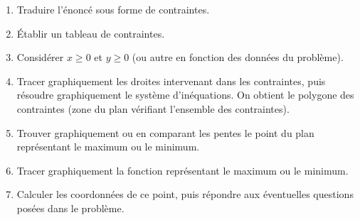 \begin{enumerate}
\item Traduire l’énoncé sous forme de contraintes.
\item Établir un tableau de contraintes.
\item Considérer $x\geq 0$ et $y \geq 0$ (ou autre en fonction des données du problème).
\item Tracer graphiquement les droites intervenant dans les contraintes, puis résoudre graphiquement le système d’inéquations. On obtient le polygone des contraintes (zone du plan vérifiant l’ensemble des contraintes).
\item Trouver graphiquement ou en comparant les pentes le point du plan représentant le maximum ou le minimum. 
\item Tracer graphiquement la fonction représentant le maximum ou le minimum.
\item Calculer les coordonnées  de ce point, puis répondre aux éventuelles questions posées dans le problème.
\end{enumerate}

